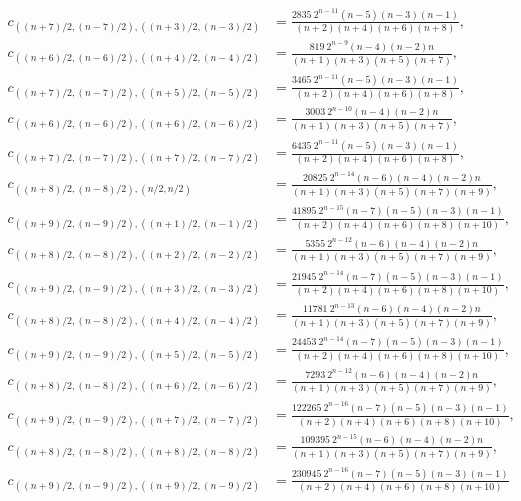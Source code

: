 \documentclass[10pt,oneside,american]{amsart}
\numberwithin{equation}{section}
\numberwithin{figure}{section}
\theoremstyle{definition}
\theoremstyle{remark}
\theoremstyle{plain}
\theoremstyle{definition}
\theoremstyle{plain}
\begin{document}
\begin{align*}
c_{\left((n+7)/2,(n-7)/2\right),\left((n+3)/2,(n-3)/2\right)} &= \frac{2835\ 2^{n-11} (n-5) (n-3) (n-1)}{(n+2) (n+4) (n+6) (n+8)}, \\
c_{\left((n+6)/2,(n-6)/2\right),\left((n+4)/2,(n-4)/2\right)} &= \frac{819\ 2^{n-9} (n-4) (n-2) n}{(n+1) (n+3) (n+5) (n+7)}, \\
c_{\left((n+7)/2,(n-7)/2\right),\left((n+5)/2,(n-5)/2\right)} &= \frac{3465\ 2^{n-11} (n-5) (n-3) (n-1)}{(n+2) (n+4) (n+6) (n+8)}, \\
c_{\left((n+6)/2,(n-6)/2\right),\left((n+6)/2,(n-6)/2\right)} &= \frac{3003\ 2^{n-10} (n-4) (n-2) n}{(n+1) (n+3) (n+5) (n+7)}, \\
c_{\left((n+7)/2,(n-7)/2\right),\left((n+7)/2,(n-7)/2\right)} &= \frac{6435\ 2^{n-11} (n-5) (n-3) (n-1)}{(n+2) (n+4) (n+6) (n+8)}, \\
c_{\left((n+8)/2,(n-8)/2\right),\left(n/2,n/2\right)} &= \frac{20825\ 2^{n-14} (n-6) (n-4) (n-2) n}{(n+1) (n+3) (n+5) (n+7) (n+9)}, \\
c_{\left((n+9)/2,(n-9)/2\right),\left((n+1)/2,(n-1)/2\right)} &= \frac{41895\ 2^{n-15} (n-7) (n-5) (n-3) (n-1)}{(n+2) (n+4) (n+6) (n+8) (n+10)}, \\
c_{\left((n+8)/2,(n-8)/2\right),\left((n+2)/2,(n-2)/2\right)} &= \frac{5355\ 2^{n-12} (n-6) (n-4) (n-2) n}{(n+1) (n+3) (n+5) (n+7) (n+9)}, \\
c_{\left((n+9)/2,(n-9)/2\right),\left((n+3)/2,(n-3)/2\right)} &= \frac{21945\ 2^{n-14} (n-7) (n-5) (n-3) (n-1)}{(n+2) (n+4) (n+6) (n+8) (n+10)}, \\
c_{\left((n+8)/2,(n-8)/2\right),\left((n+4)/2,(n-4)/2\right)} &= \frac{11781\ 2^{n-13} (n-6) (n-4) (n-2) n}{(n+1) (n+3) (n+5) (n+7) (n+9)}, \\
c_{\left((n+9)/2,(n-9)/2\right),\left((n+5)/2,(n-5)/2\right)} &= \frac{24453\ 2^{n-14} (n-7) (n-5) (n-3) (n-1)}{(n+2) (n+4) (n+6) (n+8) (n+10)}, \\
c_{\left((n+8)/2,(n-8)/2\right),\left((n+6)/2,(n-6)/2\right)} &= \frac{7293\ 2^{n-12} (n-6) (n-4) (n-2) n}{(n+1) (n+3) (n+5) (n+7) (n+9)}, \\
c_{\left((n+9)/2,(n-9)/2\right),\left((n+7)/2,(n-7)/2\right)} &= \frac{122265\ 2^{n-16} (n-7) (n-5) (n-3) (n-1)}{(n+2) (n+4) (n+6) (n+8) (n+10)}, \\
c_{\left((n+8)/2,(n-8)/2\right),\left((n+8)/2,(n-8)/2\right)} &= \frac{109395\ 2^{n-15} (n-6) (n-4) (n-2) n}{(n+1) (n+3) (n+5) (n+7) (n+9)}, \\
c_{\left((n+9)/2,(n-9)/2\right),\left((n+9)/2,(n-9)/2\right)} &= \frac{230945\ 2^{n-16} (n-7) (n-5) (n-3) (n-1)}{(n+2) (n+4) (n+6) (n+8) (n+10)}
\end{align*}
\end{document}
